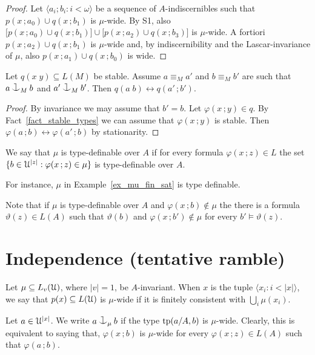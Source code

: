 \documentclass{amsproc}
\def\cnonfork{\mathbin{\raise1.8ex\rlap{\kern0.6ex\rule{0.6ex}{0.1ex}}\rlap{\kern1.1ex\rule{0.1ex}{1.9ex}}\raise-0.3ex\hbox{$\smile$} } }
\begin{document}
\begin{proof}
  Let $\langle a_i;b_i: i<\omega\rangle$ be a sequence of $A$-indiscernibles such that $p(x\,;a_0)\cup q(x\,;b_1)$ is $\mu$-wide.
  By S1, also $\big[p(x\,;a_0)\cup q(x\,;b_1)\big]\cup\big[p(x\,;a_2)\cup q(x\,;b_3)\big]$ is $\mu$-wide.
  A fortiori $p(x\,;a_2)\cup q(x\,;b_1)$ is $\mu$-wide and, by indiscernibility and the Lascar-invariance of $\mu$, also $p(x\,;a_1)\cup q(x\,;b_0)$ is wide.
\end{proof}

\begin{fact}
  Let $q(x\;y)\subseteq L(M)$ be stable.
  Assume $a\equiv_M a' $ and $b\equiv_Mb'$ are such that $a\cnonfork_M b$ and $a'\cnonfork_M b'$.
  Then $q(a\;b)\leftrightarrow q(a'\,;b')$.
\end{fact}

\begin{proof}
  By invariance we may assume that $b'=b$.
  Let $\varphi(x\,;y)\in q$.
  By Fact~\ref{fact_stable_types} we can assume that $\varphi(x\,;y)$ is stable.
  Then $\varphi(a\,;b)\leftrightarrow\varphi(a'\,;b)$ by stationarity.
\end{proof}

\begin{definition}
  We say that $\mu$ is type-definable over $A$ if for every formula $\varphi(x\,;z)\in L$ the set $\{b\in\EuScript U^{|z|} : \varphi(x\,;z)\in\mu\}$ is type-definable over $A$.
\end{definition}

For instance, $\mu$ in Example~\ref{ex_mu_fin_sat} is type definable.

Note that if $\mu$ is type-definable over $A$ and $\varphi(x\,;b)\notin\mu$ the there is a formula $\vartheta(z)\in L(A)$ such that $\vartheta(b)$ and $\varphi(x\,;b')\notin\mu$ for every $b'\models\vartheta(z)$.
\section{Independence (tentative ramble)}

Let $\mu\subseteq L_v(\EuScript U)$, where $|v|=1$, be $A$-invariant.
When $x$ is the tuple $\langle x_i:i<|x|\rangle$, we say that $p(x)\subseteq L(\EuScript U)$ is $\mu$-wide if it is finitely consistent with $\bigcup_i\mu(x_i)$.

Let $a\in\EuScript U^{|x|}$.
We write $a\cnonfork_\mu b$ if the type ${\rm tp}(a/A,b)$ is $\mu$-wide. 
Clearly, this is equivalent to saying that,  $\varphi(x\,;b)$ is $\mu$-wide for every $\varphi(x\,;z)\in L(A)$ such that $\varphi(a\,;b)$.
\end{document}
